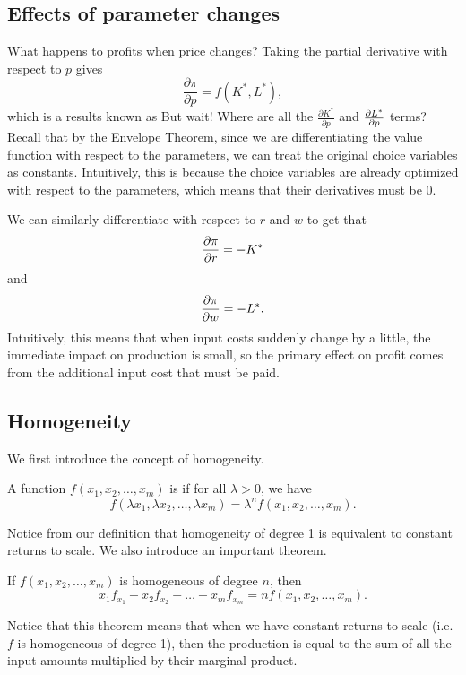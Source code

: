 \subsection*{Effects of parameter changes}

What happens to profits when price changes? Taking the partial derivative with respect to $p$ gives
$$\frac{\partial \pi}{\partial p} = f(K^*, L^*),$$
which is a results known as  But wait! Where are all the $\frac{\partial K^*}{\partial p}$ and $\pdv{L^*}{p}$ terms? Recall that by the Envelope Theorem, since we are differentiating the value function with respect to the parameters, we can treat the original choice variables as constants. Intuitively, this is because the choice variables are already optimized with respect to the parameters, which means that their derivatives must be 0. 

We can similarly differentiate with respect to $r$ and $w$ to get that 
$$\pdv{\pi}{r} = -K^*$$
and
$$\pdv{\pi}{w} = -L^*.$$
Intuitively, this means that when input costs suddenly change by a little, the immediate impact on production is small, so the primary effect on profit comes from the additional input cost that must be paid.

\subsection*{Homogeneity}
We first introduce the concept of homogeneity.
\begin{definition}
A function $f(x_1, x_2, \ldots, x_m)$ is  if for all $\lambda > 0$, we have 
$$f\left(\lambda x_{1}, \lambda x_{2}, \ldots, \lambda x_{m}\right)=\lambda^{n} f\left(x_{1}, x_{2}, \ldots, x_{m}\right).$$
\end{definition}
Notice from our definition that homogeneity of degree 1 is equivalent to constant returns to scale. We also introduce an important theorem.

\begin{theorem}[Euler]
If $f(x_1, x_2, \ldots, x_m)$ is homogeneous of degree $n$, then 
$$x_{1} f_{x_{1}}+x_{2} f_{x_{2}}+\ldots+x_{m} f_{x_{m}}=n f\left(x_{1}, x_{2}, \ldots, x_{m}\right).$$
\end{theorem}
Notice that this theorem means that when we have constant returns to scale (i.e. $f$ is homogeneous of degree 1), then the production is equal to the sum of all the input amounts multiplied by their marginal product.

